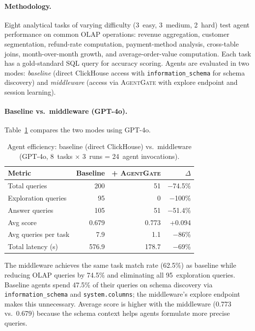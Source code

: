 \documentclass[sigconf, nonacm]{acmart}
\newcommand{\sysname}{\textsc{AgentGate}\xspace}  %
\begin{document}
\paragraph{Methodology.}
Eight analytical tasks of varying difficulty (3~easy, 3~medium, 2~hard) test
agent performance on common OLAP operations: revenue aggregation, customer
segmentation, refund-rate computation, payment-method analysis, cross-table
joins, month-over-month growth, and average-order-value computation.
Each task has a gold-standard SQL query for accuracy scoring.  Agents are
evaluated in two modes: \emph{baseline} (direct ClickHouse access with
\texttt{information\_schema} for schema discovery) and \emph{middleware}
(access via \sysname with explore endpoint and session learning).

\paragraph{Baseline vs.\ middleware (GPT-4o).}
Table~\ref{tab:efficiency} compares the two modes using GPT-4o.

\begin{table}[t]
  \centering
  \caption{%
    Agent efficiency: baseline (direct ClickHouse) vs.\ middleware
    (GPT-4o, 8~tasks $\times$ 3~runs = 24~agent invocations).
  }
  \label{tab:efficiency}
  \begin{tabular}{@{}lrrr@{}}
    \toprule
    \textbf{Metric}
      & \textbf{Baseline}
      & \textbf{+ \sysname}
      & \textbf{$\Delta$} \\
    \midrule
    Total queries          & 200   & 51    & $-$74.5\% \\
    Exploration queries    & 95    & 0     & $-$100\% \\
    Answer queries         & 105   & 51    & $-$51.4\% \\
    Avg score              & 0.679 & 0.773 & +0.094 \\
    Avg queries per task   & 7.9   & 1.1   & $-$86\% \\
    Total latency (s)      & 576.9 & 178.7 & $-$69\% \\
    \bottomrule
  \end{tabular}
\end{table}

The middleware achieves the same task match rate (62.5\%) as baseline while
reducing OLAP queries by 74.5\% and eliminating all 95~exploration queries.
Baseline agents spend 47.5\% of their queries on schema discovery via
\texttt{information\_schema} and \texttt{system.columns}; the middleware's
explore endpoint makes this unnecessary.  Average score is higher with the
middleware (0.773 vs.\ 0.679) because the schema context helps agents
formulate more precise queries.
\end{document}
